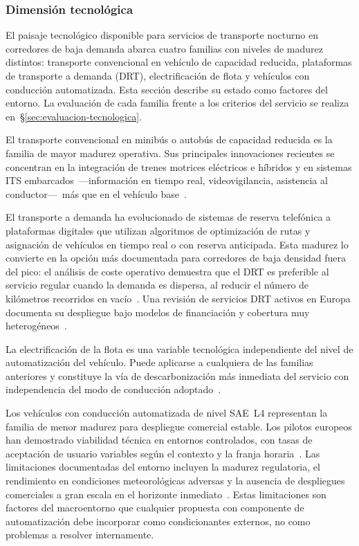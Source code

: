 \subsubsection{Dimensión tecnológica}
\label{sec:pestel-tecnologica}

El paisaje tecnológico disponible para servicios de transporte 
nocturno en corredores de baja demanda abarca cuatro familias 
con niveles de madurez distintos: transporte convencional en 
vehículo de capacidad reducida, plataformas de transporte a 
demanda (DRT), electrificación de flota y vehículos con 
conducción automatizada. Esta sección describe su estado como 
factores del entorno. La evaluación de cada familia frente 
a los criterios del servicio se realiza en~§\ref{sec:evaluacion-tecnologica}.

El transporte convencional en minibús o autobús de capacidad 
reducida es la familia de mayor madurez operativa. Sus 
principales innovaciones recientes se concentran en la 
integración de trenes motrices eléctricos e híbridos y en 
sistemas ITS embarcados~---información en tiempo real, 
videovigilancia, asistencia al conductor---~más que en el 
vehículo base~\parencite{UITP2024}.

El transporte a demanda ha evolucionado de sistemas de reserva 
telefónica a plataformas digitales que utilizan algoritmos de 
optimización de rutas y asignación de vehículos en tiempo real 
o con reserva anticipada. Esta madurez lo convierte en la 
opción más documentada para corredores de baja densidad fuera 
del pico: el análisis de coste operativo demuestra que el DRT 
es preferible al servicio regular cuando la demanda es dispersa, 
al reducir el número de kilómetros recorridos en 
vacío~\parencite{Estrada2021}. Una revisión de servicios DRT 
activos en Europa documenta su despliegue bajo modelos de 
financiación y cobertura muy 
heterogéneos~\parencite{K2Centrum2025DRT}.

La electrificación de la flota es una variable tecnológica 
independiente del nivel de automatización del vehículo. Puede 
aplicarse a cualquiera de las familias anteriores y constituye 
la vía de descarbonización más inmediata del servicio con 
independencia del modo de conducción 
adoptado~\parencite{UITP2024}.

Los vehículos con conducción automatizada de nivel SAE~L4 
representan la familia de menor madurez para despliegue 
comercial estable. Los pilotos europeos han demostrado 
viabilidad técnica en entornos controlados, con tasas de 
aceptación de usuario variables según el contexto y la 
franja horaria~\parencite{Debbaghi2025}. Las limitaciones 
documentadas del entorno incluyen la madurez regulatoria, 
el rendimiento en condiciones meteorológicas adversas y la 
ausencia de despliegues comerciales a gran escala en el 
horizonte inmediato~\parencite{KonstantasAVENUE2023lessons, 
DibaGore2025}. Estas limitaciones son factores del macroentorno 
que cualquier propuesta con componente de automatización debe 
incorporar como condicionantes externos, no como problemas 
a resolver internamente.

